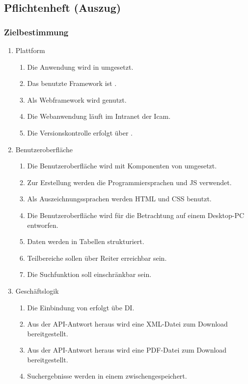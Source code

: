 \subsection{Pflichtenheft (Auszug)}
\label{app:Pflichtenheft}

\subsubsection*{Zielbestimmung}
\begin{enumerate}
    \item Plattform
        \begin{enumerate}
            \item Die Anwendung wird in  umgesetzt.
            \item Das benutzte Framework ist .
            \item Als Webframework wird  genutzt.
            \item Die Webanwendung läuft im Intranet der \acs{Icam}.
            \item Die Versionskontrolle erfolgt über .
        \end{enumerate}
    \item Benutzeroberfläche
        \begin{enumerate}
            \item Die Benutzeroberfläche wird mit Komponenten von  umgesetzt.
            \item Zur Erstellung werden die Programmiersprachen  und \acs{JS} verwendet.
            \item Als Auszeichnungssprachen werden \acs{HTML} und \acs{CSS} benutzt.
            \item Die Benutzeroberfläche wird für die Betrachtung auf einem Desktop-PC entworfen.
            \item Daten werden in Tabellen strukturiert.
            \item Teilbereiche sollen über Reiter erreichbar sein.
            \item Die Suchfunktion soll einschränkbar sein.
        \end{enumerate}
    \item Geschäftslogik
        \begin{enumerate}
            \item Die Einbindung von  erfolgt übe \acs{DI}.
            \item Aus der \acs{API}-Antwort heraus wird eine \acs{XML}-Datei zum Download bereitgestellt.
            \item Aus der \acs{API}-Antwort heraus wird eine \acs{PDF}-Datei zum Download bereitgestellt.
            \item Suchergebnisse werden in einem  zwischengespeichert.
        \end{enumerate}
\end{enumerate}